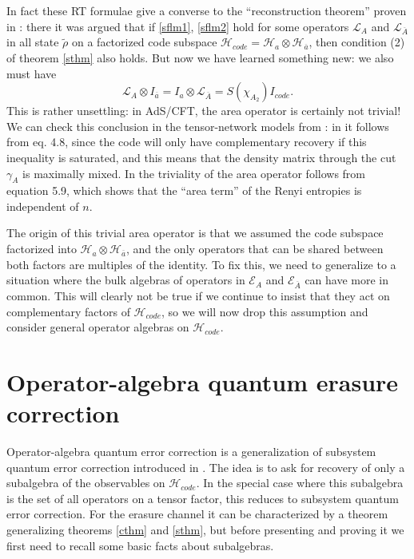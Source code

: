 \documentclass[12pt]{article}
\newcommand{\be}{\begin{equation}}
\newcommand{\ee}{\end{equation}}
\newcommand{\wt}{\widetilde}
\newcommand{\Ll}{\mathcal{L}}
\newcommand{\Ab}{\ol{A}}
\newcommand{\ab}{\ol{a}}
\newcommand{\Ha}{\mathcal{H}_{a}}
\newcommand{\Hab}{\mathcal{H}_{\ol{a}}}
\newcommand{\Hc}{\mathcal{H}_{code}}
\newcommand{\ol}{\overline}
\newcommand{\EA}{\mathcal{E}_A}
\newcommand{\EAb}{\mathcal{E}_{\Ab}}
\begin{document}
In fact these RT formulae give a converse to the ``reconstruction theorem'' proven in \cite{Dong:2016eik}: there it was argued that if \eqref{sflm1}, \eqref{sflm2} hold for some operators $\Ll_A$ and $\Ll_{\Ab}$ in all state $\wt{\rho}$ on a factorized code subspace $\Hc=\Ha\otimes \Hab$, then condition (2) of theorem \ref{sthm} also holds.  But now we have learned something new: we also must have
\be
\Ll_A\otimes I_{\ab}=I_{a}\otimes \Ll_{\Ab}=S(\chi_{A_2}) I_{code}.
\ee  
This is rather unsettling: in AdS/CFT, the area operator is certainly not trivial!  We can check this conclusion in the tensor-network models from \cite{Pastawski:2015qua,Hayden:2016cfa}: in \cite{Pastawski:2015qua} it follows from eq. 4.8, since the code will only have complementary recovery if this inequality is saturated, and this means that the density matrix through the cut $\gamma_A$ is maximally mixed.  In \cite{Hayden:2016cfa} the triviality of the area operator follows from equation 5.9, which shows that the ``area term'' of the Renyi entropies is independent of $n$.

The origin of this trivial area operator is that we assumed the code subspace factorized into $\Ha\otimes \Hab$, and the only operators that can be shared between both factors are multiples of the identity.  To fix this, we need to generalize to a situation where the bulk algebras of operators in $\EA$ and $\EAb$ can have more in common.  This will clearly not be true if we continue to insist that they act on complementary factors of $\Hc$, so we will now drop this assumption and consider general operator algebras on $\Hc$.

\section{Operator-algebra quantum erasure correction}\label{opqecsec}
Operator-algebra quantum error correction is a generalization of subsystem quantum error correction introduced in \cite{beny2007generalization,beny2007quantum}.  The idea is to ask for recovery of only a subalgebra of the observables on $\Hc$.  In the special case where this subalgebra is the set of all operators on a tensor factor, this reduces to subsystem quantum error correction.  For the erasure channel it can be characterized by a theorem  generalizing theorems \eqref{cthm} and \eqref{sthm}, but before presenting and proving it we first need to recall some basic facts about subalgebras.
\end{document}
